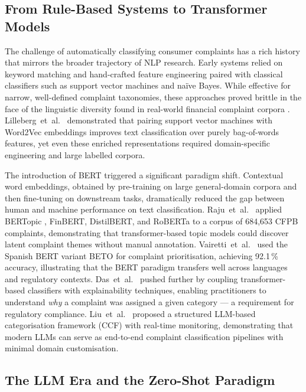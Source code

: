 \documentclass[journal]{IEEEtran}
\begin{document}
\subsection{From Rule-Based Systems to Transformer Models}

The challenge of automatically classifying consumer complaints has a
rich history that mirrors the broader trajectory of NLP research. Early
systems relied on keyword matching and hand-crafted feature engineering
paired with classical classifiers such as support vector machines and
na{\"i}ve Bayes. While effective for narrow, well-defined complaint
taxonomies, these approaches proved brittle in the face of the
linguistic diversity found in real-world financial complaint corpora
\cite{raju2022bertopic,jondhale2024cfpb}.
Lilleberg~et~al.\ \cite{lilleberg2015word2vec} demonstrated that pairing
support vector machines with Word2Vec embeddings improves text classification
over purely bag-of-words features, yet even these enriched representations
required domain-specific engineering and large labelled corpora.

The introduction of BERT \cite{devlin2019bert} triggered a significant
paradigm shift. Contextual word embeddings, obtained by pre-training on
large general-domain corpora and then fine-tuning on downstream tasks,
dramatically reduced the gap between human and machine performance on
text classification. Raju~et~al.\ \cite{raju2022bertopic} applied
BERTopic \cite{grootendorst2020bertopic}, FinBERT, DistilBERT, and
RoBERTa to a corpus of 684,653 CFPB complaints, demonstrating that
transformer-based topic models could discover latent complaint themes
without manual annotation. Vairetti~et~al.\ \cite{vairetti2024bert}
used the Spanish BERT variant BETO for complaint prioritisation,
achieving 92.1\,\% accuracy, illustrating that the BERT paradigm
transfers well across languages and regulatory contexts. Das~et~al.\
\cite{das2024explainable} pushed further by coupling transformer-based
classifiers with explainability techniques, enabling practitioners to
understand \emph{why} a complaint was assigned a given category — a
requirement for regulatory compliance. Liu~et~al.\ \cite{liu2024framework}
proposed a structured LLM-based categorisation framework (CCF) with
real-time monitoring, demonstrating that modern LLMs can serve as
end-to-end complaint classification pipelines with minimal domain
customisation.

\subsection{The LLM Era and the Zero-Shot Paradigm}
\end{document}
